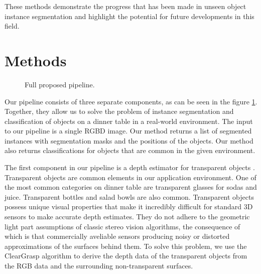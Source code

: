 \documentclass[10pt,twocolumn,letterpaper]{article}
\begin{document}
These methods demonstrate the progress that has been made in unseen object instance segmentation and highlight the potential for future developments in this field.


\section{Methods}


\begin{figure}
\begin{center}
\end{center}
   \caption{Full proposed pipeline.}
\label{fig:structure-graph}
\end{figure}



Our pipeline consists of three separate components, as can be seen in the figure \ref{fig:structure-graph}. Together, they allow us to solve the problem of instance segmentation and classification of objects on a dinner table in a real-world environment. The input to our pipeline is a single RGBD image. Our method returns a list of segmented instances with segmentation masks and the positions of the objects. Our method also returns classifications for objects that are common in the given environment.

The first component in our pipeline is a depth estimator for transparent objects \cite{Sajjan_Moore_Pan_Nagaraja_Lee_Zeng_Song_2019}. Transparent objects are common elements in our application environment. One of the most common categories on dinner table are transparent glasses for sodas and juice. Transparent bottles and salad bowls are also common. Transparent objects possess unique visual properties that make it incredibly difficult for standard 3D sensors to make accurate depth estimates. They do not adhere to the geometric light part assumptions of classic stereo vision algorithms, the consequence of which is that commercially aveliable sensors producing noisy or distorted approximations of the surfaces behind them. To solve this problem, we use the ClearGrasp algorithm to derive the depth data of the transparent objects from the RGB data and the surrounding non-transparent surfaces.
\end{document}
